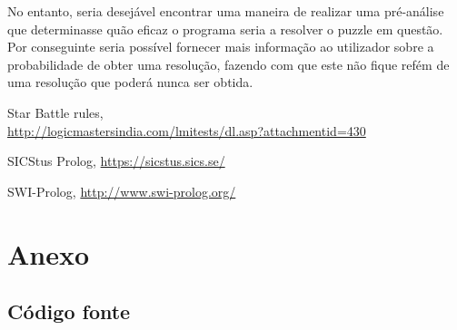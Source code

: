 \documentclass[runningheads,a4paper]{llncs}
\begin{document}
No entanto, seria desejável encontrar uma maneira de realizar uma pré-análise que determinasse quão eficaz o programa seria a resolver o puzzle em questão. Por conseguinte seria possível fornecer mais informação ao utilizador sobre a probabilidade de obter uma resolução, fazendo com que este não fique refém de uma resolução que poderá nunca ser obtida.

\begin{thebibliography}{4}

 Star Battle rules,\\
\url{http://logicmastersindia.com/lmitests/dl.asp?attachmentid=430}

 SICStus Prolog, \url{https://sicstus.sics.se/}

 SWI-Prolog, \url{http://www.swi-prolog.org/}

\end{thebibliography}

\pagebreak

\section*{Anexo}

\subsection*{Código fonte}

\newenvironment{changemargin}[2]{%
\begin{list}{}{%
\setlength{\topsep}{0pt}%
\setlength{\leftmargin}{#1}%
\setlength{\rightmargin}{#2}%
\setlength{\listparindent}{\parindent}%
\setlength{\itemindent}{\parindent}%
\setlength{\parsep}{\parskip}%
}%
\item[]}{
\end{list}}

\medskip
\end{document}
